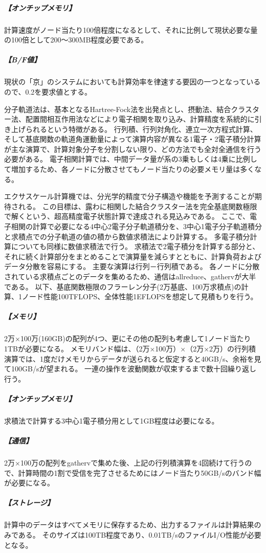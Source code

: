 \subparagraph{【オンチップメモリ】}
計算速度がノード当たり100倍程度になるとして、それに比例して現状必要な量の100倍として200～300MB程度必要である。

\subparagraph{【B/F値】}
現状の「京」のシステムにおいても計算効率を律速する要因の一つとなっているので、0.2を要求値とする。


\label{sec:4-2_要求性能_高精度分子軌道法}
分子軌道法は、基本となるHartree-Fock法を出発点とし、摂動法、結合クラスター法、配置間相互作用法などにより電子相関を取り込み、計算精度を系統的に引き上げられるという特徴がある。
行列積、行列対角化、連立一次方程式計算、そして基底関数の軌道角運動量によって演算内容が異なる1電子・2電子積分計算が主な演算で、計算対象分子を分割しない限り、どの方法でも全対全通信を行う必要がある。
電子相関計算では、中間データ量が系の3乗もしくは4乗に比例して増加するため、各ノードに分散させてもノード当たりの必要メモリ量は多くなる。

エクサスケール計算機では、分光学的精度で分子構造や機能を予測することが期待される。
この目標は、露わに相関した結合クラスター法を完全基底関数極限で解くという、超高精度電子状態計算で達成される見込みである。
ここで、電子相関の計算で必要になる4中心2電子分子軌道積分を、3中心1電子分子軌道積分と求積点での分子軌道の値の積から数値求積法により計算する。
多電子積分計算についても同様に数値求積法で行う。
求積法で2電子積分を計算する部分と、それに続く計算部分をまとめることで演算量を減らすとともに、計算負荷およびデータ分散を容易にする。
主要な演算は行列－行列積である。
各ノードに分散されている求積点ごとのデータを集めるため、通信はallreduce、gathervが大半である。
以下、基底関数極限のフラーレン分子(2万基底、100万求積点)の計算、1ノード性能100TFLOPS、全体性能1EFLOPSを想定して見積もりを行う。

\subparagraph{【メモリ】}
2万×100万(160GB)の配列が4つ、更にその他の配列も考慮して1ノード当たり1TBが必要になる。
メモリバンド幅は、（2万×100万）×（2万×2万）の行列積演算では、1度だけメモリからデータが送られると仮定すると40GB/s、余裕を見て100GB/sが望まれる。
一連の操作を波動関数が収束するまで数十回繰り返し行う。

\subparagraph{【オンチップメモリ】}
求積法で計算する3中心1電子積分用として1GB程度は必要になる。

\subparagraph{【通信】}
2万×100万の配列をgathervで集めた後、上記の行列積演算を4回続けて行うので、計算時間の1割で受信を完了させるためにはノード当たり50GB/sのバンド幅が必要になる。

\subparagraph{【ストレージ】}
計算中のデータはすべてメモリに保存するため、出力するファイルは計算結果のみである。
そのサイズは100TB程度であり、0.01TB/sのファイルI/O性能が必要となる。


